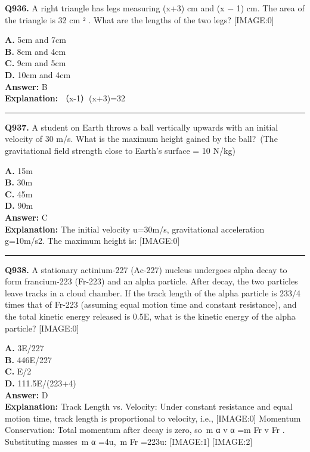 \documentclass[12pt]{article}
\begin{document}
\noindent
\textbf{Q936.} A right triangle has legs measuring (x+3) cm and (x
−
1) cm. The area of the triangle is
32
cm
²
. What are the lengths of the two legs?
[IMAGE:0]



\textbf{A.} 5cm and 7cm \\
\textbf{B.} 8cm and 4cm \\
\textbf{C.} 9cm and 5cm \\
\textbf{D.} 10cm and 4cm \\

\textbf{Answer:} B \\
\textbf{Explanation:} （x-1）(x+3)=32

\hrule
\vspace{1em}


\noindent
\textbf{Q937.} A student on Earth throws a ball vertically upwards with an initial velocity of 30 m/s. What is the maximum height gained by the ball? (The gravitational field strength close to Earth's surface = 10 N/kg)



\textbf{A.} 15m \\
\textbf{B.} 30m \\
\textbf{C.} 45m \\
\textbf{D.} 90m \\

\textbf{Answer:} C \\
\textbf{Explanation:} The initial velocity u=30m/s, gravitational acceleration g=10m/s2.
The maximum height is:
[IMAGE:0]

\hrule
\vspace{1em}


\noindent
\textbf{Q938.} A stationary actinium-227 (Ac-227) nucleus undergoes alpha decay to form francium-223 (Fr-223) and an alpha particle. After decay, the two particles leave tracks in a cloud chamber. If the track length of the alpha particle is 233/4 times that of Fr-223 (assuming equal motion time and constant resistance), and the total kinetic energy released is 0.5E, what is the kinetic energy of the alpha particle?
[IMAGE:0]



\textbf{A.} 3E/227 \\
\textbf{B.} 446E/227 \\
\textbf{C.} E/2 \\
\textbf{D.} 111.5E/(223+4) \\

\textbf{Answer:} D \\
\textbf{Explanation:} Track Length vs. Velocity: Under constant resistance and equal motion time, track length is proportional to velocity, i.e.,
[IMAGE:0]
Momentum Conservation: Total momentum after decay is zero, so m
α
v
α
=m
Fr
v
Fr
​.
Substituting masses m
α
=4u, m
Fr
=223u:
[IMAGE:1]
[IMAGE:2]
\end{document}
